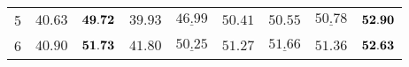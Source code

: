 \begin{table}[ht!]
\begin{tabular}{ccccccccc}
5                                       & $40.63$                              & ${\bf 49.72}$                              & $39.93$                              & $\underline{46.99}$                              & $50.41$                             & $50.55$                             & $\underline{50.78}$                 & ${\bf 52.90}$        \\
6                                       & $40.90$                              & ${\bf 51.73}$                              & $41.80$                              & $\underline{50.25}$                              & $51.27$                             & $\underline{51.66}$                 & $51.36$                             & ${\bf 52.63}$        \\ \hline
\end{tabular}
\end{table}

